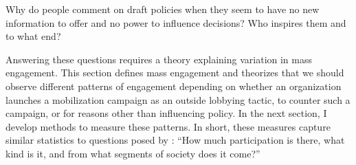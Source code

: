 
Why do people comment on draft policies when they seem to have no new information to offer and no power to influence decisions? Who inspires them and to what end? 

Answering these questions requires a theory explaining variation in mass engagement.  
This section defines mass engagement and theorizes that we should observe different patterns of engagement depending on whether an organization launches a mobilization campaign as an outside lobbying tactic, to counter such a campaign, or for reasons other than influencing policy. In the next section, I develop methods to measure these patterns. In short, these measures capture similar statistics to questions posed by \citet[p. 9]{Verba1987}: ``How much participation is there, what kind is it, and from what segments of society does it come?'' %


